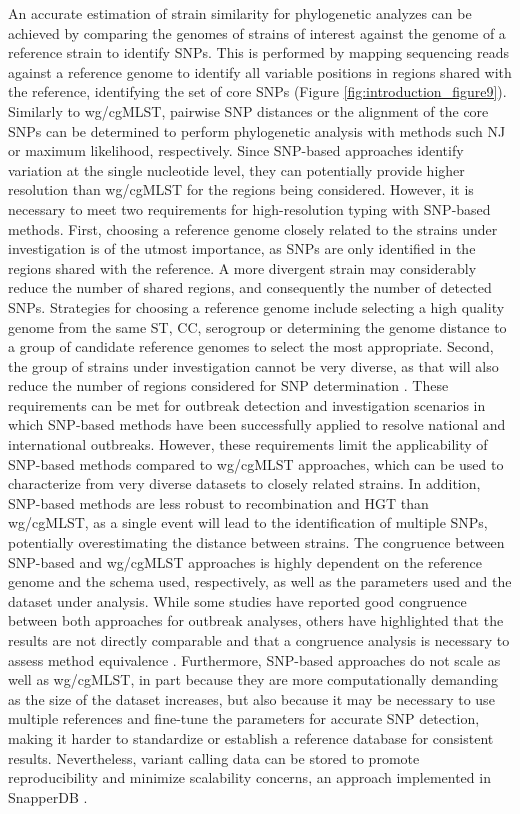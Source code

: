 An accurate estimation of strain similarity for phylogenetic analyzes can be achieved by comparing the genomes of strains of interest against the genome of a reference strain to identify \acp{SNP}. This is performed by mapping sequencing reads against a reference genome to identify all variable positions in regions shared with the reference, identifying the set of core \acp{SNP} (Figure \ref{fig:introduction_figure9}). Similarly to \ac{wg/cgMLST}, pairwise \ac{SNP} distances or the alignment of the core \acp{SNP} can be determined to perform phylogenetic analysis with methods such \ac{NJ} or maximum likelihood, respectively. Since \ac{SNP}-based approaches identify variation at the single nucleotide level, they can potentially provide higher resolution than \ac{wg/cgMLST} for the regions being considered. However, it is necessary to meet two requirements for high-resolution typing with \ac{SNP}-based methods. First, choosing a reference genome closely related to the strains under investigation is of the utmost importance, as \acp{SNP} are only identified in the regions shared with the reference. A more divergent strain may considerably reduce the number of shared regions, and consequently the number of detected \acp{SNP}. Strategies for choosing a reference genome include selecting a high quality genome from the same \ac{ST}, \acs{CC}, serogroup or determining the genome distance to a group of candidate reference genomes to select the most appropriate. Second, the group of strains under investigation cannot be very diverse, as that will also reduce the number of regions considered for \ac{SNP} determination \cite{jolley_bigsdb_2010}. These requirements can be met for outbreak detection and investigation scenarios in which \ac{SNP}-based methods have been successfully applied to resolve national and international outbreaks. However, these requirements limit the applicability of \ac{SNP}-based methods compared to \ac{wg/cgMLST} approaches, which can be used to characterize from very diverse datasets to closely related strains. In addition, \ac{SNP}-based methods are less robust to recombination and \ac{HGT} than \ac{wg/cgMLST}, as a single event will lead to the identification of multiple \acp{SNP}, potentially overestimating the distance between strains. The congruence between \ac{SNP}-based and \ac{wg/cgMLST} approaches is highly dependent on the reference genome and the schema used, respectively, as well as the parameters used and the dataset under analysis. While some studies have reported good congruence between both approaches for outbreak analyses, others have highlighted that the results are not directly comparable and that a congruence analysis is necessary to assess method equivalence \cite{mixao_multi-country_2025}. Furthermore, \ac{SNP}-based approaches do not scale as well as \ac{wg/cgMLST}, in part because they are more computationally demanding as the size of the dataset increases, but also because it may be necessary to use multiple references and fine-tune the parameters for accurate \ac{SNP} detection, making it harder to standardize or establish a reference database for consistent results. Nevertheless, variant calling data can be stored to promote reproducibility and minimize scalability concerns, an approach implemented in SnapperDB \cite{dallman_snapperdb_2018}.

